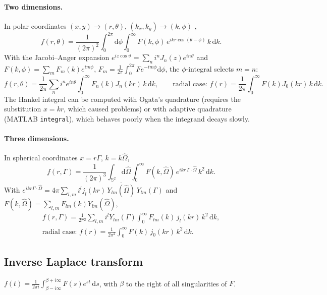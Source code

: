 \documentclass[11pt,a4paper]{article}
\numberwithin{equation}{section}
\theoremstyle{remark}
\newcommand{\Om}{\hat{\Omega}}
\newcommand{\dd}{\mathrm{d}}
\begin{document}
\paragraph{Two dimensions.}
In polar coordinates $(x,y)\to(r,\theta)$, $(k_x,k_y)\to(k,\phi)$ \cite{FourierTransforms},
\begin{equation}
f(r,\theta)=\frac{1}{(2\pi)^2}\int_0^{2\pi}\!\!\dd\phi\int_0^\infty F(k,\phi)\,e^{ikr\cos(\theta-\phi)}\,k\,\dd k .
\end{equation}
With the Jacobi--Anger expansion $e^{iz\cos\vartheta}=\sum_ni^nJ_n(z)e^{in\vartheta}$ and $F(k,\phi)=\sum_mF_m(k)e^{im\phi}$, $F_m=\frac1{2\pi}\int_0^{2\pi}F e^{-im\phi}\dd\phi$, the $\phi$-integral selects $m=n$:
\begin{equation}
f(r,\theta)=\frac{1}{2\pi}\sum_{n}i^ne^{in\theta}\int_0^\infty F_n(k)J_n(kr)\,k\,\dd k,
\qquad\text{radial case: } f(r)=\frac{1}{2\pi}\int_0^\infty F(k)J_0(kr)\,k\,\dd k .
\end{equation}
The Hankel integral can be computed with Ogata's quadrature (requires the substitution $x=kr$, which caused problems) or with adaptive quadrature (MATLAB \texttt{integral}), which behaves poorly when the integrand decays slowly.

\paragraph{Three dimensions.}
In spherical coordinates $x=r\Gamma$, $k=k\Om$,
\begin{equation}
f(r,\Gamma)=\frac{1}{(2\pi)^3}\int_{\mathbb{S}^2}\dd\Om\int_0^\infty F(k,\Om)\,e^{ikr\,\Gamma\cdot\Om}\,k^2\,\dd k .
\end{equation}
With $e^{ikr\Gamma\cdot\Om}=4\pi\sum_{l,m}i^lj_l(kr)\,\overline{Y_{lm}(\Om)}\,Y_{lm}(\Gamma)$ and $F(k,\Om)=\sum_{l,m}F_{lm}(k)Y_{lm}(\Om)$,
\begin{gather}
f(r,\Gamma)=\frac{1}{2\pi^2}\sum_{l,m}i^lY_{lm}(\Gamma)\int_0^\infty F_{lm}(k)\,j_l(kr)\,k^2\,\dd k,
\\\text{radial case: } f(r)=\frac{1}{2\pi^2}\int_0^\infty F(k)\,j_0(kr)\,k^2\,\dd k .
\end{gather}

\subsection{Inverse Laplace transform}

$f(t)=\frac{1}{2\pi i}\int_{\beta-i\infty}^{\beta+i\infty}F(s)e^{st}\,\dd s$, with $\beta$ to the right of all singularities of $F$.
\end{document}
